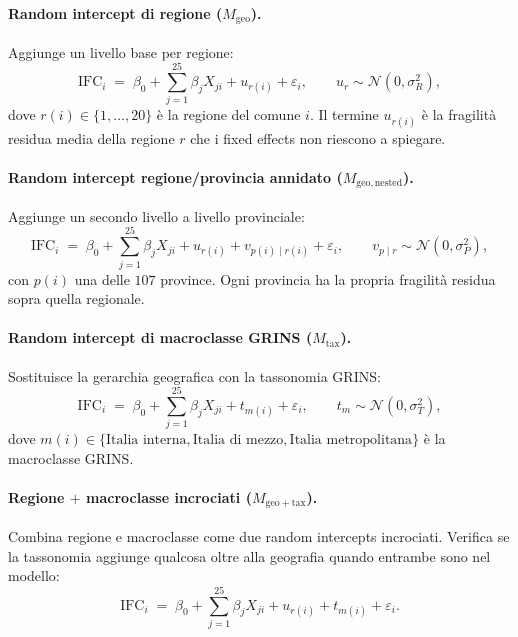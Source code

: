 \documentclass[11pt,a4paper]{article}
\begin{document}
\paragraph{Random intercept di regione ($M_{\mathrm{geo}}$).}
Aggiunge un livello base per regione:
\begin{equation}
  \mathrm{IFC}_i \;=\; \beta_0 + \sum_{j=1}^{25} \beta_j X_{ji}
                       + u_{r(i)} + \varepsilon_i,
  \qquad u_r \sim \mathcal{N}(0,\sigma_R^2),
  \label{eq:geo}
\end{equation}
dove $r(i) \in \{1,\dots,20\}$ \`e la regione del comune $i$.
Il termine $u_{r(i)}$ \`e la fragilit\`a residua media della regione
$r$ che i fixed effects non riescono a spiegare.

\paragraph{Random intercept regione/provincia annidato ($M_{\mathrm{geo,nested}}$).}
Aggiunge un secondo livello a livello provinciale:
\begin{equation}
  \mathrm{IFC}_i \;=\; \beta_0 + \sum_{j=1}^{25} \beta_j X_{ji}
                       + u_{r(i)} + v_{p(i)\mid r(i)} + \varepsilon_i,
  \qquad v_{p\mid r} \sim \mathcal{N}(0,\sigma_P^2),
  \label{eq:geo_nested}
\end{equation}
con $p(i)$ una delle $107$ province. Ogni provincia ha la propria
fragilit\`a residua sopra quella regionale.

\paragraph{Random intercept di macroclasse GRINS ($M_{\mathrm{tax}}$).}
Sostituisce la gerarchia geografica con la tassonomia GRINS:
\begin{equation}
  \mathrm{IFC}_i \;=\; \beta_0 + \sum_{j=1}^{25} \beta_j X_{ji}
                       + t_{m(i)} + \varepsilon_i,
  \qquad t_m \sim \mathcal{N}(0,\sigma_T^2),
  \label{eq:tax}
\end{equation}
dove $m(i) \in \{\text{Italia interna},\text{Italia di mezzo},
\text{Italia metropolitana}\}$ \`e la macroclasse GRINS.

\paragraph{Regione $+$ macroclasse incrociati ($M_{\mathrm{geo+tax}}$).}
Combina regione e macroclasse come due random intercepts incrociati.
Verifica se la tassonomia aggiunge qualcosa oltre alla geografia
quando entrambe sono nel modello:
\begin{equation}
  \mathrm{IFC}_i \;=\; \beta_0 + \sum_{j=1}^{25} \beta_j X_{ji}
                       + u_{r(i)} + t_{m(i)} + \varepsilon_i.
  \label{eq:geo_plus_tax}
\end{equation}
\end{document}
